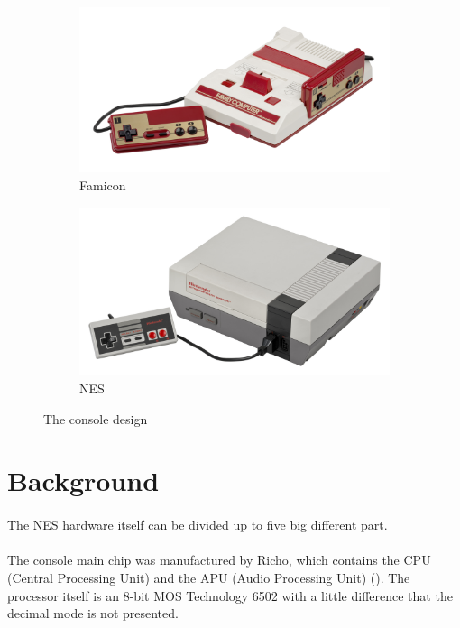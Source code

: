 \documentclass[]{report}
\begin{document}
\begin{figure}[!htb]
	\centering
	\begin{subfigure}[b]{0.4\textwidth}
		\includegraphics[width=\textwidth]{images/famicon.jpg}
		\caption{Famicon}
		\label{fig:1}
	\end{subfigure}
	\begin{subfigure}[b]{0.4\textwidth}
		\includegraphics[width=\textwidth]{images/nes.jpg}
		\caption{NES}
		\label{fig:2}
	\end{subfigure}
	\caption{\label{fig:my-label} The console design}
\end{figure}



\section{Background}
\paragraph{ }
The NES hardware itself can be divided up to five big different part. 
\paragraph{ }
The console main chip was manufactured by Richo, which contains the CPU (Central Processing Unit) and the APU (Audio Processing Unit) (\cite{CPU}).  
The processor itself is an 8-bit MOS Technology 6502 with a little difference that the decimal mode is not presented. 
\end{document}
